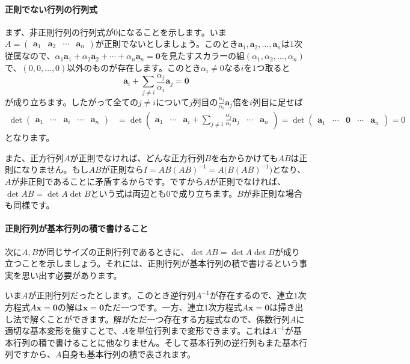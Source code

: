 \paragraph{正則でない行列の行列式} まず、非正則行列の行列式が$0$になることを示します。いま$A = \begin{pmatrix} \bm{a}_1 & \bm{a}_2 & \cdots & \bm{a}_n \end{pmatrix}$が正則でないとしましょう。このとき$\bm{a}_1, \bm{a}_2, \ldots, \bm{a}_n$は$1$次従属なので、$\alpha_1 \bm{a}_1 + \alpha_2 \bm{a}_2 + \cdots + \alpha_n \bm{a}_n = \bm{0}$を見たすスカラーの組$(\alpha_1, \alpha_2, \ldots, \alpha_n)$で、$(0, 0, \ldots, 0)$以外のものが存在します。このとき$\alpha_i \neq 0$なる$i$を$1$つ取ると
\[
\bm{a}_i + \sum_{j \neq i} \frac{\alpha_j}{\alpha_i} \bm{a}_j = \bm{0}
\]
が成り立ちます。したがって全ての$j \neq i$について$j$列目の$\frac{\alpha_j}{\alpha_i}\bm{a}_j$倍を$i$列目に足せば
\begin{align*}
\det \begin{pmatrix} \bm{a}_1 & \cdots & \bm{a}_i & \cdots & \bm{a}_n \end{pmatrix}
&= \det \begin{pmatrix} \bm{a}_1 & \cdots & \bm{a}_i + \sum_{j \neq i} \frac{\alpha_j}{\alpha_i} \bm{a}_j & \cdots & \bm{a}_n \end{pmatrix}
= \det \begin{pmatrix} \bm{a}_1 & \cdots & \bm{0} & \cdots & \bm{a}_n \end{pmatrix} = 0
\end{align*}
となります。

また、正方行列$A$が正則でなければ、どんな正方行列$B$を右からかけても$AB$は正則になりません。もし$AB$が正則なら$I = AB(AB)^{-1} = A\bigl(B(AB)^{-1}\bigr)$となり、$A$が非正則であることに矛盾するからです。ですから$A$が正則でなければ、$\det AB = \det A \det B$という式は両辺とも$0$で成り立ちます。$B$が非正則な場合も同様です。

\paragraph{正則行列が基本行列の積で書けること}

次に$A, B$が同じサイズの正則行列であるときに、$\det AB = \det A \det B$が成り立つことを示しましょう。それには、正則行列が基本行列の積で書けるという事実を思い出す必要があります。

いま$A$が正則行列だったとします。このとき逆行列$A^{-1}$が存在するので、連立$1$次方程式$A\bm{x} = \bm{0}$の解は$\bm{x} = \bm{0}$ただ一つです。一方、連立$1$次方程式$A\bm{x} = \bm{0}$は掃き出し法で解くことができます。解がただ一つ存在する方程式なので、係数行列$A$に適切な基本変形を施すことで、$A$を単位行列まで変形できます。これは$A^{-1}$が基本行列の積で書けることに他なりません。そして基本行列の逆行列もまた基本行列ですから、$A$自身も基本行列の積で表されます。

